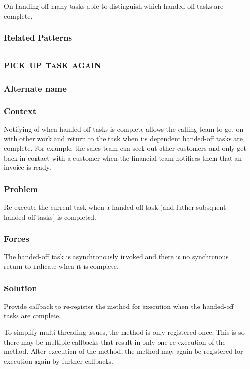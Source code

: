 \documentclass[prodmode]{style/acmlarge}
\begin{document}
On handing-off many tasks able to distinguish which handed-off tasks are
complete.

\subsubsection*{Related Patterns}



\subsection{\textsc{\textbf{pick up task again}}}

\subsubsection*{Alternate name}

\subsubsection*{Context} Notifying of when handed-off tasks is complete allows
the calling team to get on with other work and return to the task when its
dependent handed-off tasks are complete.  For example, the sales team can seek
out other customers and only get back in contact with a customer when the
financial team notifices them that an invoice is ready.

\subsubsection*{Problem} Re-execute the current task when a handed-off task (and
futher subsquent handed-off tasks) is completed.

\subsubsection*{Forces} The handed-off task is asynchronously invoked and there is
no synchronous return to indicate when it is complete.

\subsubsection*{Solution} Provide callback to re-register the method for
execution when the handed-off tasks are complete.

To simplify multi-threading issues, the method is only registered once.  This is
so there may be multiple callbacks that result in only one re-execution of the
method. After execution of the method, the method may again be registered for
execution again by further callbacks.
\end{document}
